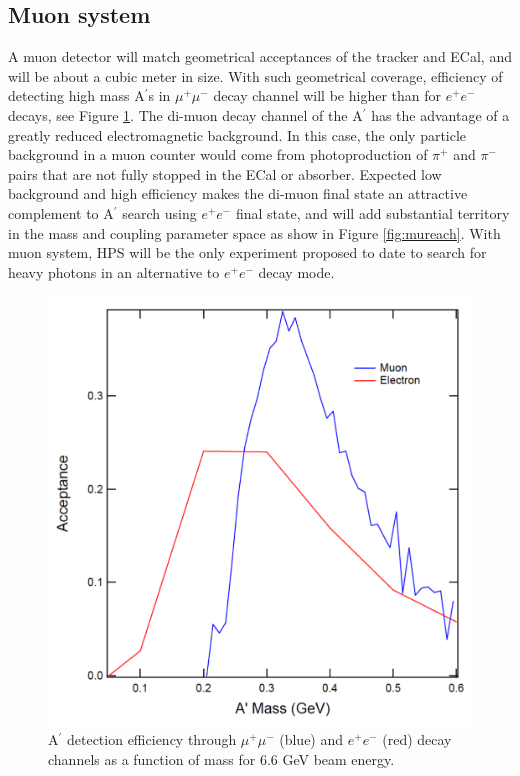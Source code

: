 \subsection{Muon system}

\label{sec:muon}


A muon detector will match geometrical acceptances of the tracker and ECal, and will be about a cubic meter in size. With such geometrical coverage, efficiency of detecting high mass A$^\prime$s in $\mu^+\mu^-$ decay channel will be higher than for $e^+e^-$ decays, see Figure \ref{fig:muacc}. The di-muon decay channel of the A$^\prime$ has the advantage of a greatly reduced electromagnetic background.  In this case, the only particle background in a muon counter would come from photoproduction of $\pi^+$ and $\pi^-$ pairs that are not fully stopped in the ECal or absorber.  Expected low background and high efficiency makes the di-muon final state an attractive complement to A$^\prime$ search using $e^+e^-$ final state, and will add substantial territory in the mass and coupling parameter space as show in Figure \ref{fig:mureach}. With muon system, HPS will be the only experiment proposed to date to search for heavy photons in an alternative to $e^+e^-$ decay mode.

\begin{figure}[!ht]
\includegraphics[scale=0.4]{muon/acc.pdf}
\caption{\small{A$^\prime$ detection efficiency through $\mu^+\mu^-$ (blue) and $e^+e^-$ (red) decay channels as a function of mass for 6.6 GeV beam energy.}}\label{fig:muacc}
\end{figure}

